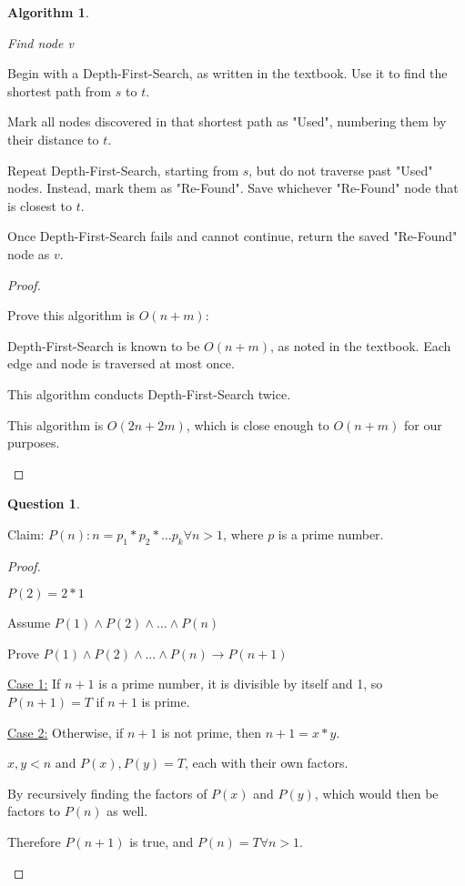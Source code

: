 \documentclass[11pt, oneside]{article}   	%
\newtheorem{Question}{Question}
\newtheorem{Algorithm}{Algorithm}
\begin{document}
\begin{Algorithm}
\begin{description}
Find node v
\end{description}
\end{Algorithm}

Begin with a Depth-First-Search, as written in the textbook. Use it to find the shortest path from $s$ to $t$.

Mark all nodes discovered in that shortest path as "Used", numbering them by their distance to $t$.

Repeat Depth-First-Search, starting from $s$, but do not traverse past "Used" nodes. Instead, mark them as "Re-Found". Save whichever "Re-Found" node that is closest to $t$.

Once Depth-First-Search fails and cannot continue, return the saved "Re-Found" node as $v$.

\begin{proof}
\begin{description}
Prove this algorithm is $O(n+m)$:

 Depth-First-Search is known to be $O(n+m)$, as noted in the textbook. Each edge and node is traversed at most once.

This algorithm conducts Depth-First-Search twice.

This algorithm is $O(2n+2m)$, which is close enough to $O(n+m)$ for our purposes.

\end{description}
\end{proof}



\begin{Question} %
\end{Question}

Claim: $P(n): n=p_1 * p_2 * \ldots p_k \forall n > 1$, where $p$ is a prime number.

\begin{proof}
\begin{description}
\item[Base Case:] $P(2) = 2*1$

Assume $P(1) \wedge P(2) \wedge \ldots \wedge P(n)$

\item Prove $P(1) \wedge P(2) \wedge \ldots \wedge P(n) \rightarrow P(n+1)$

\underline{Case 1:} If $n+1$ is a prime number, it is divisible by itself and 1, so $P(n+1) = T$ if $n+1$ is prime.

\underline{Case 2:} Otherwise, if $n+1$ is not prime, then $n+1 = x * y$.

$x,y < n$ and $P(x), P(y) = T$, each with their own factors.

By recursively finding the factors of $P(x)$ and $P(y)$, which would then be factors to $P(n)$ as well. %

Therefore $P(n+1)$ is true, and $P(n) = T \forall n > 1$.
\end{description}
\end{proof}
\end{document}
